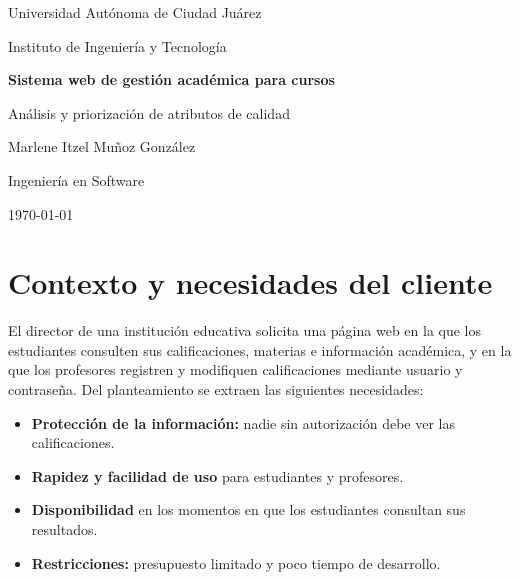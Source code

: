\documentclass[11pt,letterpaper]{article}
\begin{document}
\begin{titlepage}
  \centering
  {\large Universidad Autónoma de Ciudad Juárez\par}
  {\large Instituto de Ingeniería y Tecnología\par}
  \vspace{2.5cm}
  {\Huge\bfseries\color{azul} Sistema web de gestión académica para cursos\par}
  \vspace{0.8cm}
  {\Large Análisis y priorización de atributos de calidad\par}
  \vspace{3cm}
  {\large Marlene Itzel Muñoz González\par}
  \vspace{0.4cm}
  {\large Ingeniería en Software\par}
  \vfill
  {\large \today\par}
\end{titlepage}

\tableofcontents
\newpage

\section{Contexto y necesidades del cliente}

El director de una institución educativa solicita una página web en la que los
estudiantes consulten sus calificaciones, materias e información académica, y en
la que los profesores registren y modifiquen calificaciones mediante usuario y
contraseña. Del planteamiento se extraen las siguientes necesidades:

\begin{itemize}[leftmargin=*]
  \item \textbf{Protección de la información:} nadie sin autorización debe ver las
        calificaciones.
  \item \textbf{Rapidez y facilidad de uso} para estudiantes y profesores.
  \item \textbf{Disponibilidad} en los momentos en que los estudiantes consultan
        sus resultados.
  \item \textbf{Restricciones:} presupuesto limitado y poco tiempo de desarrollo.
\end{itemize}

\end{document}
